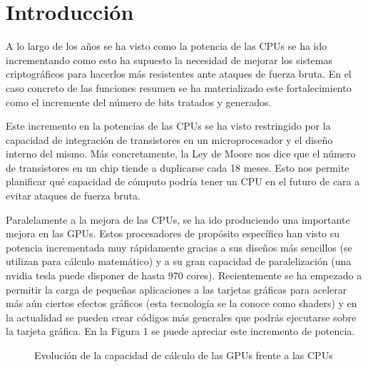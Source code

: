 \chapter{Introducción}

A lo largo de los años se ha visto como la potencia de las CPUs se ha ido incrementando como esto ha supuesto la necesidad de mejorar los sistemas criptográficos para hacerlos más resistentes ante ataques de fuerza bruta. En el caso concreto de las funciones resumen se ha materializado este fortalecimiento como el incremente del número de bits tratados y generados.

Este incremento en la potencias de las CPUs se ha visto restringido por la capacidad de integración de transistores en un microprocesador y el diseño interno del mismo. Más concretamente, la Ley de Moore nos dice que el número de transistores en un chip tiende a duplicarse cada 18 meses. Esto nos permite planificar qué capacidad de cómputo podría tener un CPU en el futuro de cara a evitar ataques de fuerza bruta.

Paralelamente a la mejora de las CPUs, se ha ido produciendo una importante mejora en las GPUs. Estos procesadores de propósito específico han visto su potencia incrementada muy rápidamente gracias a sus diseños más sencillos (se utilizan para cálculo matemático) y a su gran capacidad de paralelización (una nvidia tesla puede disponer de hasta 970 cores). Recientemente se ha empezado a permitir la carga de pequeñas aplicaciones a las tarjetas gráficas para acelerar más aún ciertos efectos gráficos (esta tecnología se la conoce como shaders) y en la actualidad se pueden crear códigos más generales que podrás ejecutarse sobre la tarjeta gráfica. En la Figura 1 se puede apreciar este incremento de potencia.

\begin{figure}
	\centering
	  \caption{Evolución de la capacidad de cálculo de las GPUs frente a las CPUs}
\end{figure}

